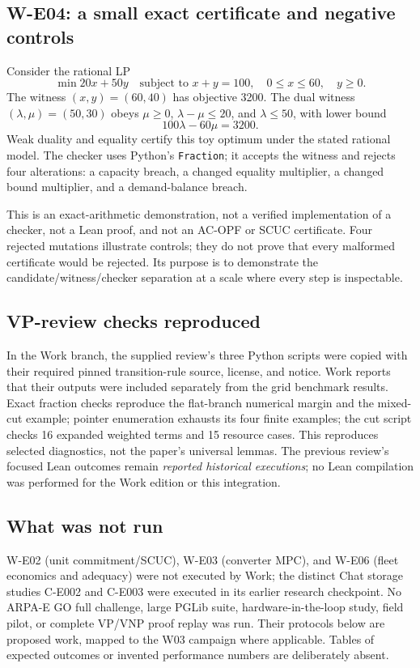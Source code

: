 \documentclass[11pt,letterpaper]{article}
\begin{document}
\subsection{W-E04: a small exact certificate and negative controls}
Consider the rational LP
\[
 \min 20x+50y\quad\text{subject to }x+y=100,\quad0\le x\le60,\quad y\ge0.
\]
The witness $(x,y)=(60,40)$ has objective 3200. The dual witness $(\lambda,\mu)=(50,30)$ obeys $\mu\ge0$, $\lambda-\mu\le20$, and $\lambda\le50$, with lower bound
\[
 100\lambda-60\mu=3200.
\]
Weak duality and equality certify this toy optimum under the stated rational model. The checker uses Python's \texttt{Fraction}; it accepts the witness and rejects four alterations: a capacity breach, a changed equality multiplier, a changed bound multiplier, and a demand-balance breach.

This is an exact-arithmetic demonstration, not a verified implementation of a checker, not a Lean proof, and not an AC-OPF or SCUC certificate. Four rejected mutations illustrate controls; they do not prove that every malformed certificate would be rejected. Its purpose is to demonstrate the candidate/witness/checker separation at a scale where every step is inspectable.

\subsection{VP-review checks reproduced}
In the Work branch, the supplied review's three Python scripts were copied with their required pinned transition-rule source, license, and notice. Work reports that their outputs were included separately from the grid benchmark results. Exact fraction checks reproduce the flat-branch numerical margin and the mixed-cut example; pointer enumeration exhausts its four finite examples; the cut script checks 16 expanded weighted terms and 15 resource cases. This reproduces selected diagnostics, not the paper's universal lemmas. The previous review's focused Lean outcomes remain \emph{reported historical executions}; no Lean compilation was performed for the Work edition or this integration.

\subsection{What was not run}
W-E02 (unit commitment/SCUC), W-E03 (converter MPC), and W-E06 (fleet economics and adequacy) were not executed by Work; the distinct Chat storage studies C-E002 and C-E003 were executed in its earlier research checkpoint. No ARPA-E GO full challenge, large PGLib suite, hardware-in-the-loop study, field pilot, or complete VP/VNP proof replay was run. Their protocols below are proposed work, mapped to the W03 campaign where applicable. Tables of expected outcomes or invented performance numbers are deliberately absent.
\end{document}
